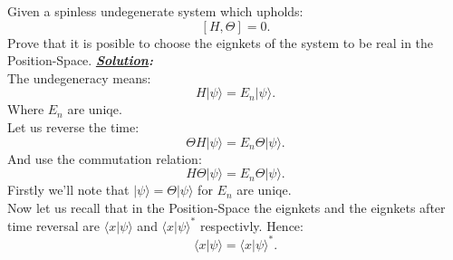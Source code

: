 \documentclass[notitlepage]{report}
\begin{document}
\newpage
\begin{question}[title = Question 5]{}{}
Given a spinless undegenerate system which upholds:\\
\[
	\left[H,\Theta\right]=0 
.\] 
Prove that it is posible to choose the eignkets of the system to be real in the Position-Space.
\tcblower
\textbf{\emph{\underline{Solution}:}}\\
The undegeneracy means:\\
\[
	H|\psi\rangle=E_n|\psi\rangle  
.\] 
Where $E_n$ are uniqe.\\
Let us reverse the time:\\
\[
	\Theta H|\psi\rangle=E_n\Theta|\psi\rangle  
.\] 
And use the commutation relation:\\
\[
	H\Theta|\psi\rangle=E_n\Theta|\psi\rangle  
.\] 
Firstly we'll note that $|\psi\rangle=\Theta|\psi\rangle$ for $E_n$ are uniqe.\\
Now let us recall that in the Position-Space the eignkets and the eignkets after time reversal are $\langle x|\psi\rangle$ and $\langle x|\psi\rangle^*$ respectivly. Hence:\\
\[
	\langle x|\psi\rangle = \langle x|\psi\rangle^*
.\] 

\end{question}
\end{document}
